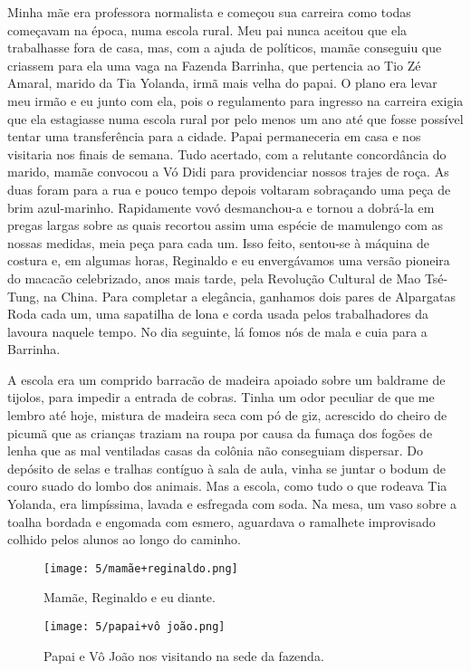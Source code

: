 Minha mãe era professora normalista e começou sua carreira como todas começavam na época, numa escola rural. 
Meu pai nunca aceitou que ela trabalhasse fora de casa, mas, com a ajuda de políticos, mamãe conseguiu que criassem para ela uma vaga na Fazenda Barrinha, que pertencia ao Tio Zé Amaral, marido da Tia Yolanda, irmã mais velha do papai. 
O plano era levar  meu irmão e eu junto com ela, pois o regulamento para ingresso na carreira exigia que ela estagiasse numa escola rural por pelo menos um ano até que fosse possível tentar uma transferência para a cidade. 
Papai permaneceria em casa e nos visitaria nos finais de semana. 
Tudo acertado, com a relutante concordância do marido, mamãe convocou a Vó Didi para providenciar nossos trajes de roça. 
As duas foram para a rua e pouco tempo depois voltaram sobraçando uma peça de brim azul-marinho. 
Rapidamente vovó desmanchou-a e tornou a dobrá-la em pregas largas sobre as quais recortou assim uma espécie de mamulengo com as nossas medidas, meia peça para cada um. 
Isso feito, sentou-se à máquina de costura e, em algumas horas, Reginaldo e eu envergávamos uma versão pioneira do macacão celebrizado, anos mais tarde, pela Revolução Cultural de Mao Tsé-Tung, na China. 
Para completar a elegância, ganhamos dois pares de Alpargatas Roda cada um, uma sapatilha de lona e corda usada pelos trabalhadores da lavoura naquele tempo. 
No dia seguinte, lá fomos nós de mala e cuia para a Barrinha.
                     
A escola era um comprido barracão de madeira apoiado sobre um baldrame de tijolos, para impedir a entrada de cobras. 
Tinha um odor peculiar de que me lembro até hoje, mistura de madeira seca com pó de giz, acrescido do cheiro de picumã que as crianças traziam na roupa por causa da fumaça dos fogões de lenha que as mal ventiladas casas da colônia não conseguiam dispersar. 
Do depósito de selas e tralhas contíguo à sala de aula, vinha se juntar o bodum de couro suado do lombo dos animais. 
Mas a escola, como tudo o que rodeava Tia Yolanda, era limpíssima, lavada e esfregada com soda. Na mesa, um vaso sobre a toalha bordada e engomada com esmero, aguardava o ramalhete improvisado colhido pelos alunos ao longo do caminho.  


\begin{figure}[H]
\centering
\texttt{[image: 5/mamãe+reginaldo.png]}
\caption{Mamãe, Reginaldo e eu diante.}
\end{figure}

\begin{figure}[H]
\centering
\texttt{[image: 5/papai+vô joão.png]}
\caption{Papai e Vô João nos visitando na sede da fazenda.}
\end{figure}


